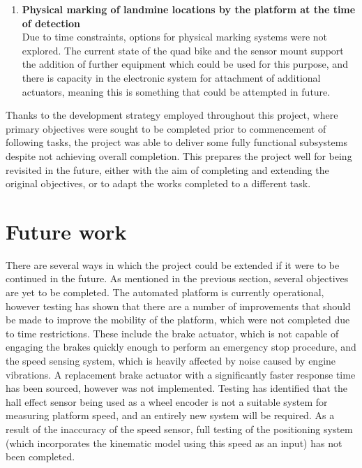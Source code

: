 \documentclass[main.tex]{subfiles}
\begin{document}
\begin{enumerate}
\item \textbf{Physical marking of landmine locations by the platform at the time of detection}\\ 
Due to time constraints, options for physical marking systems were not explored. The current state of the quad bike and the sensor mount support the addition of further equipment which could be used for this purpose, and there is capacity in the electronic system for attachment of additional actuators, meaning this is something that could be attempted in future.  
\end{enumerate}

Thanks to the development strategy employed throughout this project, where primary objectives were sought to be completed prior to commencement of following tasks, the project was able to deliver some fully functional subsystems despite not achieving overall completion. This prepares the project well for being revisited in the future, either with the aim of completing and extending the original objectives, or to adapt the works completed to a different task. 

\section{Future work}

There are several ways in which the project could be extended if it were to be continued in the future. %
As mentioned in the previous section, several objectives are yet to be completed. The automated platform is currently operational, however testing has shown that there are a number of improvements that should be made to improve the mobility of the platform, which were not completed due to time restrictions. These include the brake actuator, which is not capable of engaging the brakes quickly enough to perform an emergency stop procedure, and the speed sensing system, which is heavily affected by noise caused by engine vibrations. A replacement brake actuator with a significantly faster response time has been sourced, however was not implemented. Testing has identified that the hall effect sensor being used as a wheel encoder is not a suitable system for measuring platform speed, and an entirely new system will be required. As a result of the inaccuracy of the speed sensor, full testing of the positioning system (which incorporates the kinematic model using this speed as an input) has not been completed.
\end{document}

